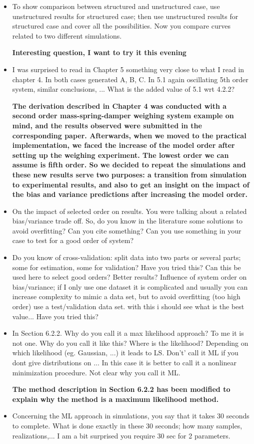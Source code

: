 \documentclass[11pt]{article}
\begin{document}
\begin{itemize}
	\item   To show comparison between structured and unstructured case, use unstructured results for structured case; then use unstructured results for structured case and cover all the possibilities. Now you compare curves related to two different simulations.
	
	{\bfseries \color{red} Interesting question, I want to try it this evening \color{black}}
	
	\item   I was surprised to read in Chapter 5 something very close to what I read in chapter 4. In both cases generated A, B, C. In 5.1 again oscillating 5th order system, similar conclusions, ... What is the added value of 5.1 wrt 4.2.2?
	
	{\bfseries The derivation described in Chapter 4 was conducted with a second order mass-spring-damper weighing system example on mind, and the results observed were submitted in the corresponding paper. Afterwards, when we moved to the practical implementation, we faced the increase of the model order after setting up the weighing experiment. The lowest order we can assume is fifth order. So we decided to repeat the simulations and these new results serve two purposes: a transition from simulation to experimental results, and also to get an insight on the impact of the bias and variance predictions after increasing the model order.    }
	
	\item   On the impact of selected order on results. You were talking about a related bias/variance trade off. So, do you know in the literature some solutions to avoid overfitting? Can you cite something? Can you use something in your case to test for a good order of system?
	\item   Do you know of cross-validation: split data into two parts or several parts; some for estimation, some for validation? Have you tried this? Can this be used here to select good orders? Better results? Influence of system order on bias/variance; if I only use one dataset it is complicated and usually you can increase complexity to mimic a data set, but to avoid overfitting (too high order) use a test/validation data set. with this i should see what is the best value... Have you tried this?
	\item   In Section 6.2.2. Why do you call it a max likelihood approach? To me it is not one. Why do you call it like this? Where is the likelihood? Depending on which likelihood (eg. Gaussian, ...) it leads to LS. Don't' call it ML if you dont give distributions on ... In this case it is better to call it a nonlinear minimization procedure. Not clear why you call it ML.
	
	{\bfseries The method description in Section 6.2.2 has been modified to explain why the method is a maximum likelihood method.  }
	
	\item   Concerning the ML approach in simulations, you say that it takes 30 seconds to complete. What is done exactly in these 30 seconds; how many samples, realizations,... I am a bit surprised you require 30 sec for 2 parameters.
\end{itemize}
\end{document}
